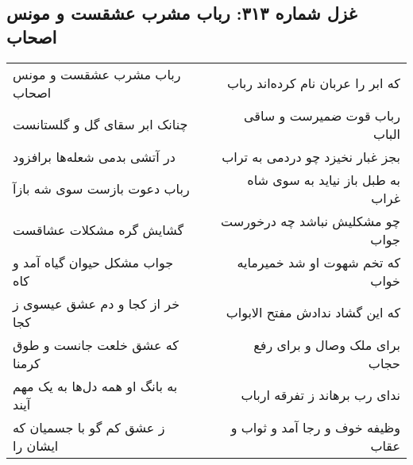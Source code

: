 \begin{center}
\section*{غزل شماره ۳۱۳: رباب مشرب عشقست و مونس اصحاب}
\label{sec:0313}
\begin{longtable}{l p{0.5cm} r}
رباب مشرب عشقست و مونس اصحاب
&&
که ابر را عربان نام کرده‌اند رباب
\\
چنانک ابر سقای گل و گلستانست
&&
رباب قوت ضمیرست و ساقی الباب
\\
در آتشی بدمی شعله‌ها برافزود
&&
بجز غبار نخیزد چو دردمی به تراب
\\
رباب دعوت بازست سوی شه بازآ
&&
به طبل باز نیاید به سوی شاه غراب
\\
گشایش گره مشکلات عشاقست
&&
چو مشکلیش نباشد چه درخورست جواب
\\
جواب مشکل حیوان گیاه آمد و کاه
&&
که تخم شهوت او شد خمیرمایه خواب
\\
خر از کجا و دم عشق عیسوی ز کجا
&&
که این گشاد ندادش مفتح الابواب
\\
که عشق خلعت جانست و طوق کرمنا
&&
برای ملک وصال و برای رفع حجاب
\\
به بانگ او همه دل‌ها به یک مهم آیند
&&
ندای رب برهاند ز تفرقه ارباب
\\
ز عشق کم گو با جسمیان که ایشان را
&&
وظیفه خوف و رجا آمد و ثواب و عقاب
\\
\end{longtable}
\end{center}
